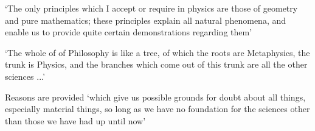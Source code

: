 \documentclass[12pt]{extarticle}
\begin{document}
\begin{multicols*}{3}
‘The only principles which I accept or require in physics are those of geometry and pure mathematics;  these principles explain all natural phenomena, and enable us to provide quite certain demonstrations  regarding them’  
\citep[p.~247 AT 2:64]{descartes:1985_csm1}
 
‘The whole of of Philosophy is like a tree, of which the roots are Metaphysics,
the trunk is Physics, and the branches which come out of this trunk are all the
other sciences ...’
\citep[p.~186]{descartes:1985_csm1}
 
Reasons are provided ‘which give us possible grounds for doubt about all things, especially material things,  
so long as we have no foundation for the sciences other than those we have had up until now’
 


    
    







\footnotesize


\end{multicols*}
\end{document}
